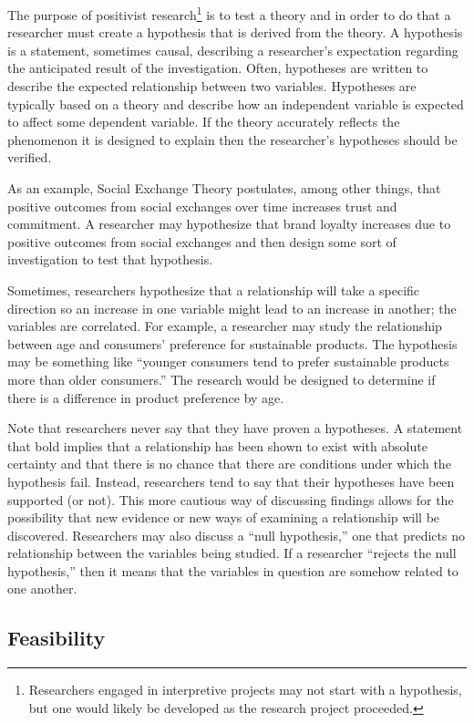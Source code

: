 The purpose of \gls{positivist} research\footnote{Researchers engaged in interpretive projects may not start with a hypothesis, but one would likely be developed as the research project proceeded.} is to test a theory and in order to do that a researcher must create a \gls{hypothesis} that is derived from the theory. A hypothesis is a statement, sometimes causal, describing a researcher's expectation regarding the anticipated result of the investigation. Often, hypotheses are written to describe the expected relationship between two \glspl{variable}. Hypotheses are typically based on a theory and describe how an independent variable is expected to affect some dependent variable. If the theory accurately reflects the phenomenon it is designed to explain then the researcher's hypotheses should be verified.

As an example, Social Exchange Theory postulates, among other things, that positive outcomes from social exchanges over time increases trust and commitment\cite{lambe2001social}. A researcher may hypothesize that brand loyalty increases due to positive outcomes from social exchanges and then design some sort of investigation to test that hypothesis.

Sometimes, researchers hypothesize that a relationship will take a specific direction so an increase in one variable might lead to an increase in another; the variables are correlated. For example, a researcher may study the relationship between age and consumers' preference for sustainable products. The hypothesis may be something like ``younger consumers tend to prefer sustainable products more than older consumers.'' The research would be designed to determine if there is a difference in product preference by age. 

Note that researchers never say that they have proven a hypotheses. A statement that bold implies that a relationship has been shown to exist with absolute certainty and that there is no chance that there are conditions under which the hypothesis fail. Instead, researchers tend to say that their hypotheses have been supported (or not). This more cautious way of discussing findings allows for the possibility that new evidence or new ways of examining a relationship will be discovered. Researchers may also discuss a ``null hypothesis,'' one that predicts no relationship between the variables being studied. If a researcher ``rejects the null hypothesis,'' then it means that the variables in question are somehow related to one another.

\subsection{Feasibility}

